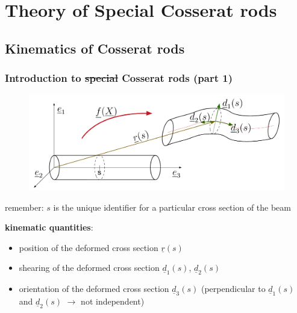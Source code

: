 \section{Theory of Special Cosserat rods}


\subsection{Kinematics of Cosserat rods}

\begin{frame}
  \frametitle{Introduction to \st{special} Cosserat rods (part 1)}
  
  \vspace{-1em}
  \begin{figure}
    \centering
    \includegraphics[width=20cm, keepaspectratio=true]{sections/cosserat_rods/images/Kinematics}
  \end{figure}
  
  remember: $s$ is the unique identifier for a particular cross section of the beam
  \vspace{0.6em}
  
  \textbf{kinematic quantities}:
  \begin{itemize}
    \item position of the deformed cross section $\underline{r}(s)$
    \item shearing of the deformed cross section $\underline{d}_1(s)$, $\underline{d}_2(s)$
    \item orientation of the deformed cross section $\underline{d}_3(s)$ \newline
      \null \quad (perpendicular to $\underline{d}_1(s)$ and $\underline{d}_2(s)$ $\rightarrow$ not independent)
  \end{itemize}
\end{frame}


